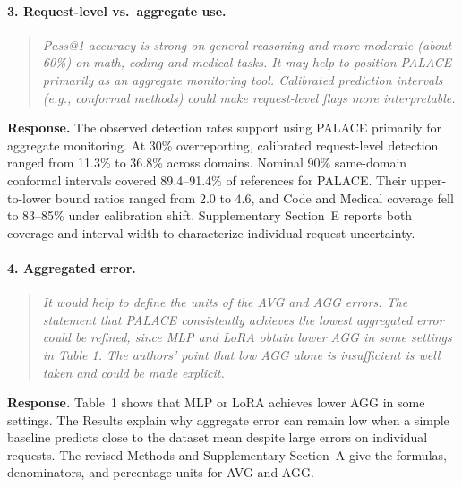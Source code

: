 \documentclass[11pt]{article}
\begin{document}
\paragraph{3. Request-level vs.\ aggregate use.}
\begin{quote}\small\itshape
Pass@1 accuracy is strong on general reasoning and more moderate (about 60\%) on math, coding and medical tasks. It may help to position PALACE primarily as an aggregate monitoring tool. Calibrated prediction intervals (e.g., conformal methods) could make request-level flags more interpretable.
\end{quote}
\textbf{Response.} The observed detection rates support using PALACE primarily for aggregate monitoring. At 30\% overreporting, calibrated request-level detection ranged from 11.3\% to 36.8\% across domains. Nominal 90\% same-domain conformal intervals covered 89.4--91.4\% of references for PALACE. Their upper-to-lower bound ratios ranged from 2.0 to 4.6, and Code and Medical coverage fell to 83--85\% under calibration shift. Supplementary Section~E reports both coverage and interval width to characterize individual-request uncertainty.

\paragraph{4. Aggregated error.}
\begin{quote}\small\itshape
It would help to define the units of the AVG and AGG errors. The statement that PALACE consistently achieves the lowest aggregated error could be refined, since MLP and LoRA obtain lower AGG in some settings in Table 1. The authors' point that low AGG alone is insufficient is well taken and could be made explicit.
\end{quote}
\textbf{Response.} Table~1 shows that MLP or LoRA achieves lower AGG in some settings. The Results explain why aggregate error can remain low when a simple baseline predicts close to the dataset mean despite large errors on individual requests. The revised Methods and Supplementary Section~A give the formulas, denominators, and percentage units for AVG and AGG.
\end{document}
